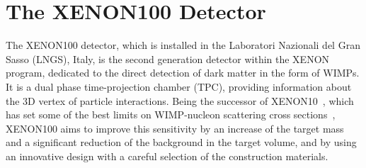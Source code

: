 \chapter{The XENON100 Detector}
\label{chXe100detector}

The XENON100 detector, which is installed in the Laboratori Nazionali del Gran Sasso (LNGS), Italy, is the second generation detector within the XENON program, dedicated to the direct detection of dark matter in the form of WIMPs. It is a dual phase time-projection chamber (TPC), providing information about the 3D vertex of particle interactions. Being the successor of XENON10~\cite{xe10-instrument}, which has set some of the best limits on WIMP-nucleon scattering cross sections~\cite{xe10-independent, xe10-dependent}, XENON100 aims to improve this sensitivity by an increase of the target mass and a significant reduction of the background in the target volume, and by using an innovative design with a careful selection of the construction materials.
